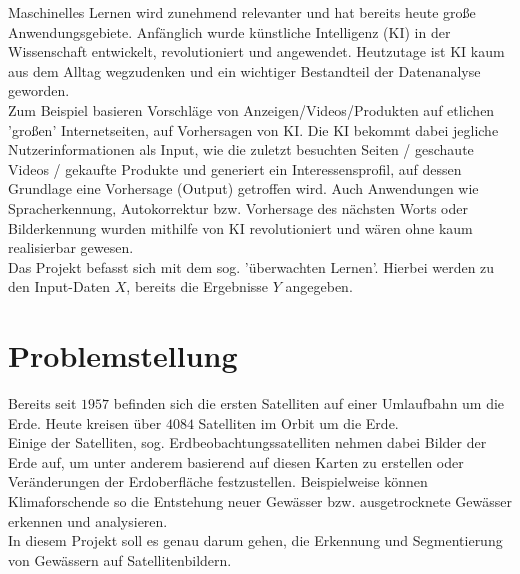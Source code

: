 Maschinelles Lernen wird zunehmend relevanter und hat bereits heute große Anwendungsgebiete.
Anfänglich wurde künstliche Intelligenz (KI) in der Wissenschaft entwickelt, revolutioniert und angewendet.
Heutzutage ist KI kaum aus dem Alltag wegzudenken und ein wichtiger Bestandteil der Datenanalyse geworden.
\\
Zum Beispiel basieren Vorschläge von Anzeigen/Videos/Produkten auf etlichen 'großen' Internetseiten, auf Vorhersagen von KI.
Die KI bekommt dabei jegliche Nutzerinformationen als Input, wie die zuletzt besuchten Seiten / geschaute Videos / gekaufte Produkte und generiert ein Interessensprofil, auf dessen Grundlage eine Vorhersage (Output) getroffen wird.
Auch Anwendungen wie Spracherkennung, Autokorrektur bzw. Vorhersage des nächsten Worts oder Bilderkennung wurden mithilfe von KI revolutioniert und wären ohne kaum realisierbar gewesen.
\\
%
Das Projekt befasst sich mit dem sog. 'überwachten Lernen'.
Hierbei werden zu den Input-Daten $X$, bereits die Ergebnisse $Y$ angegeben.

\section{Problemstellung}
Bereits seit $1957$ befinden sich die ersten Satelliten auf einer Umlaufbahn um die Erde.
Heute kreisen über $4084$ Satelliten im Orbit um die Erde.\cite{ucsusa}
\\
Einige der Satelliten, sog. Erdbeobachtungssatelliten nehmen dabei Bilder der Erde auf, um unter anderem basierend auf diesen Karten zu erstellen oder Veränderungen der Erdoberfläche festzustellen.
Beispielweise können Klimaforschende so die Entstehung neuer Gewässer bzw. ausgetrocknete Gewässer erkennen und analysieren.
\\
In diesem Projekt soll es genau darum gehen, die Erkennung und Segmentierung von Gewässern auf Satellitenbildern.
\\

